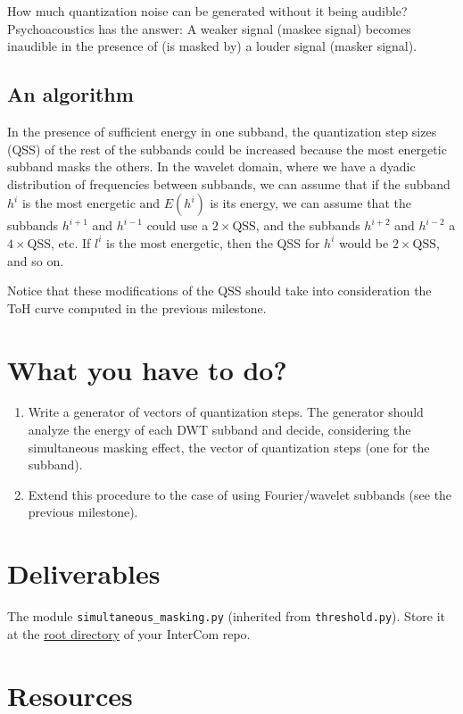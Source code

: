 How much quantization noise can be generated without it being audible?
Psychoacoustics has the answer: A weaker signal (maskee signal) becomes
inaudible in the presence of (is masked by) a louder signal (masker signal). 

\subsection{An algorithm}

In the presence of sufficient energy in one subband, the quantization
step sizes (QSS) of the rest of the subbands could be increased
because the most energetic subband masks the others. In the wavelet
domain, where we have a dyadic distribution of frequencies between
subbands, we can assume that if the subband $h^i$ is the most
energetic and $E(h^i)$ is its energy, we can assume that the subbands
$h^{i+1}$ and $h^{i-1}$ could use a $2\times\text{QSS}$, and the subbands $h^{i+2}$
and $h^{i-2}$ a $4\times\text{QSS}$, etc. If $l^i$ is the most energetic, then the
QSS for $h^i$ would be $2\times\text{QSS}$, and so on.

Notice that these modifications of the QSS should take into
consideration the ToH curve computed in the previous milestone.
  
\section{What you have to do?}

\begin{enumerate}
\item Write a generator of vectors of quantization steps. The
  generator should analyze the energy of each DWT subband and decide,
  considering the simultaneous masking effect, the vector of
  quantization steps (one for the subband).
\item Extend this procedure to the case of using Fourier/wavelet
  subbands (see the previous milestone).
\end{enumerate}

\section{Deliverables}

The module \verb|simultaneous_masking.py| (inherited from
\verb|threshold.py|). Store it at the
\href{https://github.com/Tecnologias-multimedia/intercom}{root
  directory} of your InterCom repo.

\section{Resources}



